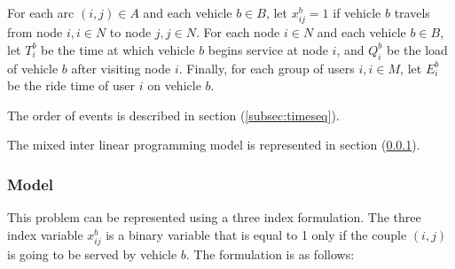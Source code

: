 \documentclass{article}
\begin{document}
For each arc $(i, j) \in A$ and each vehicle $b\in B$, let $x_{ij}^{b} = 1$ if vehicle $b$ travels from node $i, i \in N$ to node $j, j \in N$. For each node $ i \in N$ and each vehicle $b \in B$, let $T^{b}_{i} $ be the time at which vehicle $b$
begins service at node $i$, and $Q^{b}_{i}$ be the load of vehicle $b$ after visiting node $i$. Finally, for each group of users $i, i \in M$, let $E^{b}_{i}$ be the ride time of user $i$ on vehicle $b$.

\noindent The order of events is described in section (\ref{subsec:timeseq}).

\noindent  The mixed inter linear programming model is represented in section (\ref{subsection:model}).
\subsubsection{Model}
\label{subsection:model}

This problem can be represented using a three index formulation. The three index variable $x_{ij}^{b}$ is a binary variable that is equal to 1 only if the couple  $(i,j)$ is going to be served by vehicle $b$. The formulation is as follows:
\end{document}
